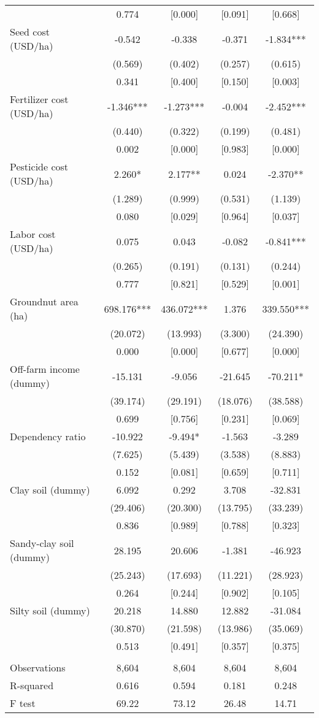 \documentclass[]{article}
\begin{document}
\begin{tabular}{lcccc}
 & 0.774 & [0.000] & [0.091] & [0.668] \\
Seed cost (USD/ha) & -0.542 & -0.338 & -0.371 & -1.834*** \\
 & (0.569) & (0.402) & (0.257) & (0.615) \\
 & 0.341 & [0.400] & [0.150] & [0.003] \\
Fertilizer cost (USD/ha) & -1.346*** & -1.273*** & -0.004 & -2.452*** \\
 & (0.440) & (0.322) & (0.199) & (0.481) \\
 & 0.002 & [0.000] & [0.983] & [0.000] \\
Pesticide cost (USD/ha) & 2.260* & 2.177** & 0.024 & -2.370** \\
 & (1.289) & (0.999) & (0.531) & (1.139) \\
 & 0.080 & [0.029] & [0.964] & [0.037] \\
Labor cost (USD/ha) & 0.075 & 0.043 & -0.082 & -0.841*** \\
 & (0.265) & (0.191) & (0.131) & (0.244) \\
 & 0.777 & [0.821] & [0.529] & [0.001] \\
Groundnut area (ha) & 698.176*** & 436.072*** & 1.376 & 339.550*** \\
 & (20.072) & (13.993) & (3.300) & (24.390) \\
 & 0.000 & [0.000] & [0.677] & [0.000] \\
Off-farm income (dummy) & -15.131 & -9.056 & -21.645 & -70.211* \\
 & (39.174) & (29.191) & (18.076) & (38.588) \\
 & 0.699 & [0.756] & [0.231] & [0.069] \\
Dependency ratio & -10.922 & -9.494* & -1.563 & -3.289 \\
 & (7.625) & (5.439) & (3.538) & (8.883) \\
 & 0.152 & [0.081] & [0.659] & [0.711] \\
Clay soil (dummy) & 6.092 & 0.292 & 3.708 & -32.831 \\
 & (29.406) & (20.300) & (13.795) & (33.239) \\
 & 0.836 & [0.989] & [0.788] & [0.323] \\
Sandy-clay soil (dummy) & 28.195 & 20.606 & -1.381 & -46.923 \\
 & (25.243) & (17.693) & (11.221) & (28.923) \\
 & 0.264 & [0.244] & [0.902] & [0.105] \\
Silty soil (dummy) & 20.218 & 14.880 & 12.882 & -31.084 \\
 & (30.870) & (21.598) & (13.986) & (35.069) \\
 & 0.513 & [0.491] & [0.357] & [0.375] \\
 &  &  &  &  \\
Observations & 8,604 & 8,604 & 8,604 & 8,604 \\
R-squared & 0.616 & 0.594 & 0.181 & 0.248 \\
 F test & 69.22 & 73.12 & 26.48 & 14.71 \\ \hline
\end{tabular}
\end{document}
